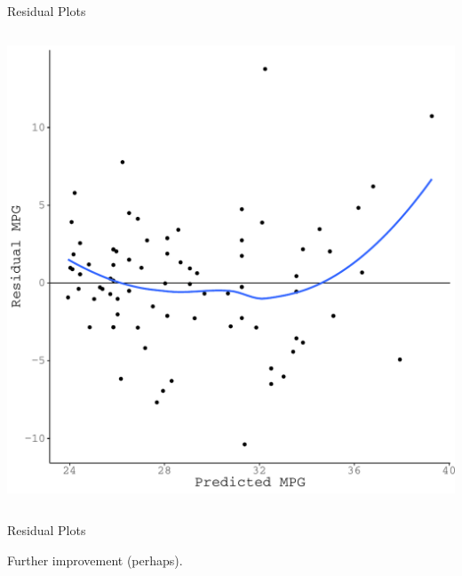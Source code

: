 \documentclass[10pt]{beamer}\usepackage[]{graphicx}\usepackage[]{color}
\makeatletter
\def\maxwidth{ %
  \ifdim\Gin@nat@width>\linewidth
    \linewidth
  \else
    \Gin@nat@width
  \fi
}
\newenvironment{knitrout}{}{} %
\makeatother
\begin{document}
{\begin{frame}{Residual Plots}
\begin{columns}
\begin{column}{0.5\textwidth}
\begin{knitrout}
{\centering \includegraphics[width=\maxwidth]{figure/assumptions-unnamed-chunk-16-1} 

}


\end{knitrout}

\end{column}
\end{columns}

\end{frame}


\begin{frame}{Residual Plots}

  Further improvement (perhaps).
  \vb
  \begin{columns}
    \begin{column}{0.5\textwidth}

\begin{knitrout}\footnotesize
{}\color{fgcolor}


\end{knitrout}
\end{column}
\end{columns}
\end{frame}}
\end{document}
